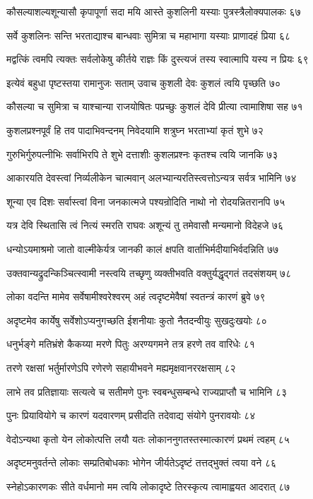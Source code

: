 कौसल्याशल्यशून्यासौ कृपापूर्णा सदा मयि
आस्ते कुशलिनी यस्याः पुत्रस्त्रैलोक्यपालकः ६७

सर्वे कुशलिनः सन्ति भरताद्याश्च बान्धवाः
सुमित्रा च महाभागा यस्याः प्राणादहं प्रिया ६८

मद्वत्किं त्वमपि त्यक्तः सर्वलोकेषु कीर्तये
राज्ञः किं दुस्त्यजं तस्य स्वात्मापि यस्य न प्रियः ६९

इत्येवं बहुधा पृष्टस्तया रामानुजः सताम्
उवाच कुशली देवः कुशलं त्वयि पृच्छति ७०

कौसल्या च सुमित्रा च याश्चान्या राजयोषितः
पप्रच्छुः कुशलं देवि प्रीत्या त्वामाशिषा सह ७१

कुशलप्रश्नपूर्वं हि तव पादाभिवन्दनम्
निवेदयामि शत्रुघ्न भरताभ्यां कृतं शुभे ७२

गुरुभिर्गुरुपत्नीभिः सर्वाभिरपि ते शुभे
दत्ताशीः कुशलप्रश्नः कृतश्च त्वयि जानकि ७३

आकारयति देवस्त्वां निर्व्यलीकेन चात्मवान्
अलभ्यान्यरतिस्त्वत्तोऽन्यत्र सर्वत्र भामिनि ७४

शून्या एव दिशः सर्वास्त्वां विना जनकात्मजे
पश्यन्रोदिति नाथो नो रोदयन्नितरानपि ७५

यत्र देवि स्थितासि त्वं नित्यं स्मरति राघवः
अशून्यं तु तमेवासौ मन्यमानो विदेहजे ७६

धन्योऽयमाश्रमो जातो वाल्मीकेर्यत्र जानकी
कालं क्षपति वार्ताभिर्मदीयाभिर्वदन्निति ७७

उक्तवान्यद्रुदन्किञ्चित्स्वामी नस्त्वयि तच्छृणु
व्यक्तीभवति वक्तुर्यद्धृद्गतं तदसंशयम् ७८

लोका वदन्ति मामेव सर्वेषामीश्वरेश्वरम्
अहं त्वदृष्टमेवैषां स्वतन्त्रं कारणं ब्रुवे ७९

अदृष्टमेव कार्येषु सर्वेशोऽप्यनुगच्छति
ईशनीयाः कुतो नैतदन्वीयुः सुखदुःखयोः ८०

धनुर्भङ्गे मतिभ्रंशे कैकय्या मरणे पितुः
अरण्यगमने तत्र हरणे तव वारिधेः ८१

तरणे रक्षसां भर्तुर्मारणेऽपि रणेरणे
सहायीभवने मह्यमृक्षवानररक्षसाम् ८२

लाभे तव प्रतिज्ञायाः सत्यत्वे च सतीमणे
पुनः स्वबन्धुसम्बन्धे राज्यप्राप्तौ च भामिनि ८३

पुनः प्रियावियोगे च कारणं यदवारणम्
प्रसीदति तदेवाद्य संयोगे पुनरावयोः ८४

वेदोऽन्यथा कृतो येन लोकोत्पत्ति लयौ यतः
लोकाननुगतस्तस्मात्कारणं प्रथमं त्वहम् ८५

अदृष्टमनुवर्तन्ते लोकाः सम्प्रतिबोधकाः
भोगेन जीर्यतेऽदृष्टं तत्तद्भुक्तं त्वया वने ८६

स्नेहोऽकारणकः सीते वर्धमानो मम त्वयि
लोकादृष्टे तिरस्कृत्य त्वामाह्वयत आदरात् ८७

